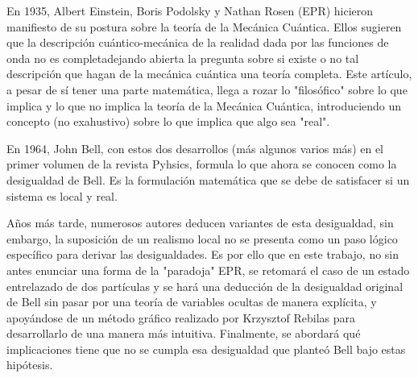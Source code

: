 En 1935, Albert Einstein, Boris Podolsky y Nathan Rosen (EPR) hicieron manifiesto de su postura sobre la teoría de la Mecánica Cuántica. Ellos sugieren que la descripción cuántico-mecánica de la realidad dada por las funciones de onda no es completadejando abierta la pregunta sobre si existe o no tal descripción que hagan de la mecánica cuántica una teoría completa. \cite{EPR} Este artículo, a pesar de sí tener una parte matemática, llega a rozar lo "filosófico" sobre lo que implica y lo que no implica la teoría de la Mecánica Cuántica, introduciendo un concepto (no exahustivo) sobre lo que implica que algo sea "real".

En 1964, John Bell, con estos dos desarrollos (más algunos varios más) en el primer volumen de la revista Pyhsics, formula lo que ahora se conocen como la desigualdad de Bell. Es la formulación matemática que se debe de satisfacer si un sistema es local y real. 

Años más tarde, numerosos autores deducen variantes de esta desigualdad, sin embargo, la suposición de un realismo local no se presenta como un paso lógico específico para derivar las desigualdades. Es por ello que en este trabajo, no sin antes enunciar una forma de la "paradoja" EPR, se retomará el caso de un estado entrelazado de dos partículas y se hará una deducción de la desigualdad original de Bell sin pasar por una teoría de variables ocultas de manera explícita, y apoyándose de un método gráfico realizado por Krzysztof Rebilas \cite{Rebilas} para desarrollarlo de una manera más intuitiva. Finalmente, se abordará qué implicaciones tiene que no se cumpla esa desigualdad que planteó Bell bajo estas hipótesis.